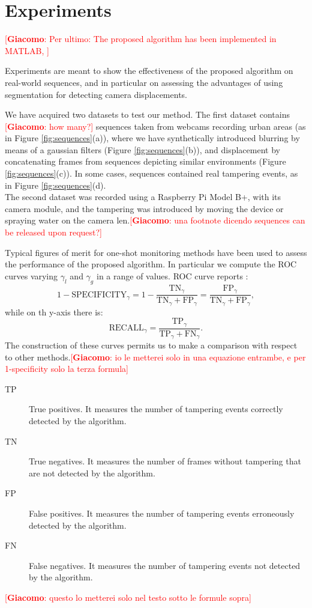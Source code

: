 \documentclass{llncs}
\newcommand{\gi}[1]{{\textcolor{red}{[\small \textbf{Giacomo}: #1]}}}
\begin{document}

\section{Experiments}\label{sec:experiments}
\gi{Per ultimo: The proposed algorithm has been implemented in MATLAB, }

Experiments are meant to show the effectiveness of the proposed algorithm on real-world sequences, and in particular on assessing the advantages of using segmentation for detecting camera displacements.

We have acquired two datasets to test our method. The first dataset contains \gi{how many?} sequences taken from webcams recording urban areas (as in Figure \ref{fig:sequences}(a)), where we have synthetically introduced blurring by means of a gaussian filters (Figure \ref{fig:sequences}(b)), and displacement by concatenating frames from sequences depicting similar environments (Figure \ref{fig:sequences}(c)). In some cases, sequences contained real tampering events, as in Figure \ref{fig:sequences}(d).\\


The second dataset was recorded using a Raspberry Pi Model B+, with its camera module, and the tampering was introduced by moving the device or spraying water on the camera len.\gi{una footnote dicendo sequences can be released upon request?}

Typical figures of merit for one-shot monitoring methods have been used to assess the performance of the proposed algorithm. In particular we compute the ROC curves varying $\gamma_l$ and $\gamma_g$ in a range of values. ROC curve reports :
\[1-\text{SPECIFICITY}_\gamma = 1-\frac{\text{TN}_\gamma}{\text{TN}_\gamma+\text{FP}_\gamma}=\frac{\text{FP}_\gamma}{\text{TN}_\gamma+\text{FP}_\gamma},\]
while on th y-axis there is:
\[\text{RECALL}_\gamma=\frac{\text{TP}_\gamma}{\text{TP}_\gamma+\text{FN}_\gamma}.\]
The construction of these curves permits us to make a comparison with respect to other methods.\gi{io le metterei solo in una equazione entrambe, e per 1-specificity solo la terza formula}

\begin{description}
	\item[TP]  True positives. It measures the number of tampering events correctly detected by the algorithm.\\ 
	\item[TN]  True negatives. It measures the number of frames without tampering that are not detected by the algorithm. \\ 
	\item[FP]  False positives. It measures the number of tampering events erroneously detected by the algorithm.\\ 
	\item[FN]  False negatives. It measures the number of tampering events not detected by the algorithm. \\ 
\end{description} 
\gi{questo lo metterei solo nel testo sotto le formule sopra}
\end{document}
